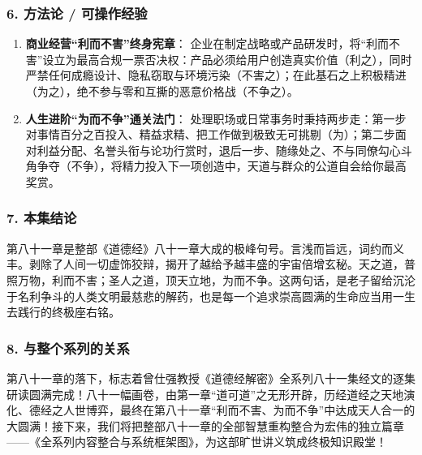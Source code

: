 \subsubsection{6. 方法论 / 可操作经验}
\begin{enumerate}
    \item \textbf{商业经营“利而不害”终身宪章}：
    企业在制定战略或产品研发时，将“利而不害”设立为最高合规一票否决权：产品必须给用户创造真实价值（利之），同时严禁任何成瘾设计、隐私窃取与环境污染（不害之）；在此基石之上积极精进（为之），绝不参与零和互撕的恶意价格战（不争之）。
    \item \textbf{人生进阶“为而不争”通关法门}：
    处理职场或日常事务时秉持两步走：第一步对事情百分之百投入、精益求精、把工作做到极致无可挑剔（为）；第二步面对利益分配、名誉头衔与论功行赏时，退后一步、随缘处之、不与同僚勾心斗角争夺（不争），将精力投入下一项创造中，天道与群众的公道自会给你最高奖赏。
\end{enumerate}

\subsubsection{7. 本集结论}
第八十一章是整部《道德经》八十一章大成的极峰句号。言浅而旨远，词约而义丰。剥除了人间一切虚饰狡辩，揭开了越给予越丰盛的宇宙倍增玄秘。天之道，普照万物，利而不害；圣人之道，顶天立地，为而不争。这两句话，是老子留给沉沦于名利争斗的人类文明最慈悲的解药，也是每一个追求崇高圆满的生命应当用一生去践行的终极座右铭。

\subsubsection{8. 与整个系列的关系}
第八十一章的落下，标志着曾仕强教授《道德经解密》全系列八十一集经文的逐集研读圆满完成！八十一幅画卷，由第一章“道可道”之无形开辟，历经道经之天地演化、德经之人世博弈，最终在第八十一章“利而不害、为而不争”中达成天人合一的大圆满！接下来，我们将把整部八十一章的全部智慧重构整合为宏伟的独立篇章——《全系列内容整合与系统框架图》，为这部旷世讲义筑成终极知识殿堂！